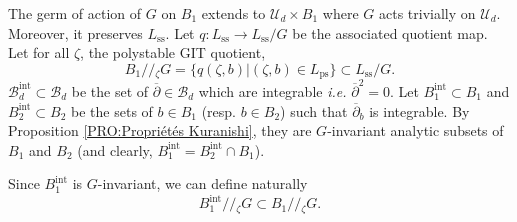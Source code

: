 \documentclass{article}
\theoremstyle{remark}
\theoremstyle{definition}
\newcommand{\mB}{\mathcal{B}}
\newcommand{\mU}{\mathcal{U}}
\newcommand{\dbar}{\overline{\partial}}
\begin{document}
The germ of action of $G$ on $B_1$ extends to $\mU_d \times B_1$ where $G$ acts trivially on $\mU_d$. Moreover, it preserves $L_{\mathrm{ss}}$. Let $q : L_{\mathrm{ss}} \rightarrow L_{\mathrm{ss}}/G$ be the associated quotient map. Let for all $\zeta$, the polystable GIT quotient,
$$
B_1/\!/\!_\zeta G = \{q(\zeta,b)|(\zeta,b) \in L_{\mathrm{ps}}\} \subset L_{\mathrm{ss}}/G.
$$
$\mB_d^{\mathrm{int}} \subset \mB_d$ be the set of $\dbar \in \mB_d$ which are integrable \textit{i.e.} $\dbar^2 = 0$. Let $B_1^{\mathrm{int}} \subset B_1$ and $B_2^{\mathrm{int}} \subset B_2$ be the sets of $b \in B_1$ (resp. $b \in B_2$) such that $\dbar_b$ is integrable. By Proposition \ref{PRO:Propriétés Kuranishi}, they are $G$-invariant analytic subsets of $B_1$ and $B_2$ (and clearly, $B_1^{\mathrm{int}} = B_2^{\mathrm{int}} \cap B_1$).

Since $B_1^{\mathrm{int}}$ is $G$-invariant, we can define naturally
$$
B_1^{\mathrm{int}}/\!/\!_\zeta G \subset B_1/\!/\!_\zeta G.
$$
\end{document}
